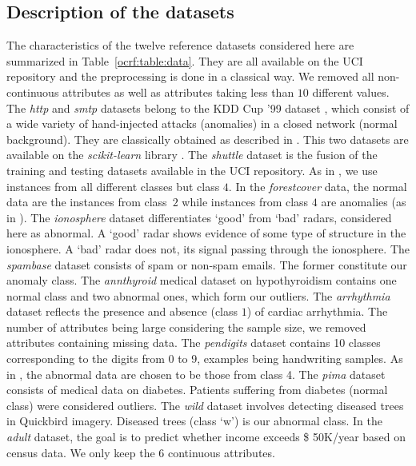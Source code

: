\subsection{Description of the datasets}
%
The characteristics of the twelve reference datasets considered here are summarized
in Table~\ref{ocrf:table:data}. They are all available on the UCI repository
\citep{Lichman2013} and the preprocessing is done in a classical way. %
We removed all non-continuous attributes as well as attributes taking less than $10$ different values.
%
The \emph{http} and \emph{smtp} datasets belong to the KDD Cup '99 dataset \citep{KDD99, Tavallaee2009}, which consist of a wide variety of hand-injected  attacks (anomalies) in a closed network (normal background). They are classically obtained as described in \cite{Yamanishi2000}. This two datasets are available on the \emph{scikit-learn} library \citep{sklearn2011}.
The \emph{shuttle} dataset is the fusion of the training and testing datasets available in the UCI repository. As in \cite{Liu2008}, we use instances from all different classes but class $4$. %
In the \emph{forestcover} data, the normal data are the instances from class~$2$ while instances from class $4$ are anomalies (as in \cite{Liu2008}). %
The \emph{ionosphere} dataset differentiates `good' from `bad' radars, considered here as abnormal. A `good' radar shows evidence of some type of structure in the ionosphere. A `bad' radar does not, its signal passing through the ionosphere.
The \emph{spambase} dataset consists of spam or non-spam emails. The former constitute our anomaly class.
The \emph{annthyroid} medical dataset on hypothyroidism contains one normal class and two abnormal ones, which form our outliers.
The \emph{arrhythmia} dataset reflects the presence and absence (class $1$) of cardiac arrhythmia. The number of attributes being large considering the sample size, we removed attributes containing missing data.
The \emph{pendigits} dataset contains 10 classes corresponding to the digits from 0 to 9, examples being handwriting samples. As in \cite{Schubert2012}, the abnormal data are chosen to be those from class 4.
The \emph{pima} dataset consists of medical data on diabetes. Patients suffering from diabetes (normal class) were considered outliers.
The \emph{wild} dataset involves detecting diseased trees in Quickbird imagery. Diseased trees (class `w') is our abnormal class.
In the \emph{adult} dataset, the goal is to predict whether income exceeds \$ 50K/year based on census data. We only keep the 6 continuous attributes.

